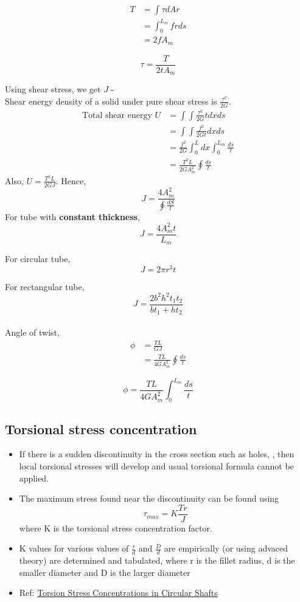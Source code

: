 \documentclass{article}
\begin{document}
	\begin{align*}
		T &= \int \tau dA r\\
		  &= \int_0^{L_m} frds\\
		  &= 2 f A_m 
	\end{align*}

	\[\boxed{\tau= \frac{T}{2tA_m}}\]

	Using shear stress, we get $J$ -\\
	Shear energy density of a solid under pure shear stress is $\frac{\tau^2}{2G}$. 
	\begin{align*}
		\text{Total shear energy }U &= \int\int \frac{\tau^2}{2G} t dx ds\\
								   &= \int \int \frac{f^2}{2Gt} dx ds\\
								   &= \frac{f^2}{2G} \int_0^L dx \int_0^{L_m} \frac{ds}{t}\\
								   &= \frac{T^2 L}{2G A_m^2} \oint \frac{ds}{t}
	\end{align*}
	Also, $U = \frac{T^2 L}{2G J}$.
	Hence, 
		\[\boxed{J = \frac{4A_m^2}{\oint\frac{dS}{t}}}\]
	For tube with \textbf{constant thickness},
		\[\boxed{J = \frac{4A_m^2t}{L_m}}\]

	For circular tube,
		\[J= 2\pi r^3 t\]

	For rectangular tube, 
		\[J = \frac{2b^2 h^2 t_1 t_2}{bt_1 + ht_2}\]\\

	Angle of twist,
	\begin{align*}
		\phi &= \frac{TL}{GJ}\\
			 &= \frac{TL}{4GA_m^2}\oint \frac{ds}{t}
	\end{align*}

	\[\boxed{\phi = \frac{TL}{4GA_m^2}\int_0^{L_m} \frac{ds}{t}}\]


	\subsection{Torsional stress concentration}
	\begin{itemize}
		\item If there is a sudden discontinuity in the cross section such as holes, , then local torsional stresses will develop and usual torsional formula cannot be applied.
		\item The maximum stress found near the discontinuity can be found using
		\[\tau_{max} = K \frac{Tr}{J}\]
		where K is the torsional stress concentration factor.
		\item K values for various values of $\frac{r}{d}$ and $\frac{D}{d}$ are empirically (or using advaced theory) are determined and tabulated, where r is the fillet radius, d is the smaller diameter and D is the larger diameter
		\item Ref: \href{https://classes.mst.edu/civeng110/concepts/06/concentration/index.html#:~:text=The%20ratio%20of%20the%20true,of%20stress%20raiser%20in%20question.}{Torsion Stress Concentrations in Circular Shafts}
	\end{itemize}
\end{document}
